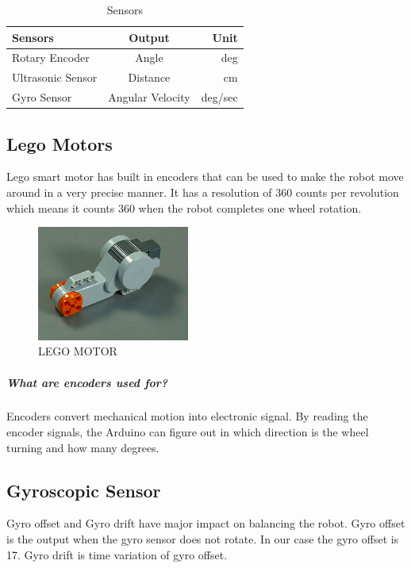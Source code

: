 \documentclass{article}
\begin{document}
 		\begin{table}[h]
 		\begin{center}
 			\caption{Sensors}
 			\label{tab:table1}
 			\begin{tabular}{l|c|r} %
 				\textbf{Sensors} & \textbf{Output} & \textbf{Unit}\\
 				\hline
 				Rotary Encoder & Angle & deg\\
 				Ultrasonic Sensor & Distance & cm\\
 				Gyro Sensor & Angular Velocity & deg/sec\\
 			\end{tabular}
 		\end{center}
 		
 	\end{table}
 	
 	
 	
 	\subsection{Lego Motors}
 	Lego smart motor has built in encoders that can be used to make the robot move around in a very precise manner. It has a resolution of 360 counts per revolution which means it counts 360 when the robot completes one wheel rotation.
 	 
 	\begin{figure}[h]
 		\centering
 		\includegraphics[width=50mm,scale=0.5]{legomotor}
 		\caption{LEGO MOTOR}
 		\label{ LEGO MOTOR}
 	\end{figure} 
  
 
 	\subparagraph{What are encoders used for?}
 	Encoders convert mechanical motion into electronic signal. By reading the encoder signals, the Arduino can figure out in which direction is the wheel turning and how many degrees.
 	
 	\subsection{Gyroscopic Sensor}
 	Gyro offset and Gyro drift have major impact on balancing the robot.
 	Gyro offset is the output when the gyro sensor does not rotate. In our case the gyro offset is 17. Gyro drift is time variation of gyro offset.
 	
\end{document}
